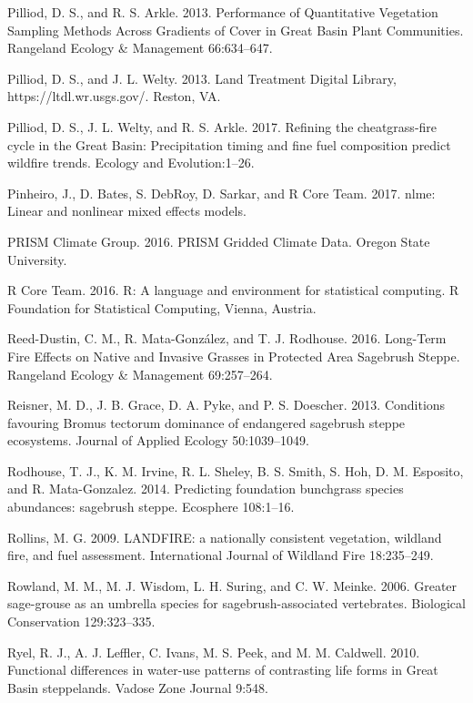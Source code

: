 \documentclass[12pt,]{article}
\begin{document}
\hypertarget{ref-Pilliod2013}{}
Pilliod, D. S., and R. S. Arkle. 2013. Performance of Quantitative
Vegetation Sampling Methods Across Gradients of Cover in Great Basin
Plant Communities. Rangeland Ecology \& Management 66:634--647.

\hypertarget{ref-ltdl2013}{}
Pilliod, D. S., and J. L. Welty. 2013. Land Treatment Digital Library,
https://ltdl.wr.usgs.gov/. Reston, VA.

\hypertarget{ref-Pilliod2017}{}
Pilliod, D. S., J. L. Welty, and R. S. Arkle. 2017. Refining the
cheatgrass-fire cycle in the Great Basin: Precipitation timing and fine
fuel composition predict wildfire trends. Ecology and Evolution:1--26.

\hypertarget{ref-Pinheiro2017}{}
Pinheiro, J., D. Bates, S. DebRoy, D. Sarkar, and R Core Team. 2017.
nlme: Linear and nonlinear mixed effects models.

\hypertarget{ref-PRISM2016}{}
PRISM Climate Group. 2016. PRISM Gridded Climate Data. Oregon State
University.

\hypertarget{ref-R}{}
R Core Team. 2016. R: A language and environment for statistical
computing. R Foundation for Statistical Computing, Vienna, Austria.

\hypertarget{ref-Reed-dustin2016}{}
Reed-Dustin, C. M., R. Mata-González, and T. J. Rodhouse. 2016.
Long-Term Fire Effects on Native and Invasive Grasses in Protected Area
Sagebrush Steppe. Rangeland Ecology \& Management 69:257--264.

\hypertarget{ref-Reisner2013}{}
Reisner, M. D., J. B. Grace, D. A. Pyke, and P. S. Doescher. 2013.
Conditions favouring Bromus tectorum dominance of endangered sagebrush
steppe ecosystems. Journal of Applied Ecology 50:1039--1049.

\hypertarget{ref-Rodhouse2014}{}
Rodhouse, T. J., K. M. Irvine, R. L. Sheley, B. S. Smith, S. Hoh, D. M.
Esposito, and R. Mata-Gonzalez. 2014. Predicting foundation bunchgrass
species abundances: sagebrush steppe. Ecosphere 108:1--16.

\hypertarget{ref-Rollins2009}{}
Rollins, M. G. 2009. LANDFIRE: a nationally consistent vegetation,
wildland fire, and fuel assessment. International Journal of Wildland
Fire 18:235--249.

\hypertarget{ref-Rowland2006}{}
Rowland, M. M., M. J. Wisdom, L. H. Suring, and C. W. Meinke. 2006.
Greater sage-grouse as an umbrella species for sagebrush-associated
vertebrates. Biological Conservation 129:323--335.

\hypertarget{ref-Ryel2010}{}
Ryel, R. J., A. J. Leffler, C. Ivans, M. S. Peek, and M. M. Caldwell.
2010. Functional differences in water-use patterns of contrasting life
forms in Great Basin steppelands. Vadose Zone Journal 9:548.
\end{document}
